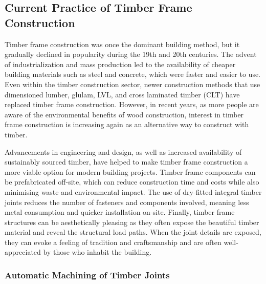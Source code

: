     
\subsection{Current Practice of Timber Frame Construction}
\label{subsection:introduction-current-practice-of-timber-frame-construction}

Timber frame construction was once the dominant building method, but it gradually declined in popularity during the 19th and 20th centuries. The advent of industrialization and mass production led to the availability of cheaper building materials such as steel and concrete, which were faster and easier to use. Even within the timber construction sector, newer construction methods that use dimensioned lumber, glulam, LVL, and cross laminated timber (CLT) have replaced timber frame construction. However, in recent years, as more people are aware of the environmental benefits of wood construction, interest in timber frame construction is increasing again as an alternative way to construct with timber. 

Advancements in engineering and design, as well as increased availability of sustainably sourced timber, have helped to make timber frame construction a more viable option for modern building projects. Timber frame components can be prefabricated off-site, which can reduce construction time and costs while also minimising waste and environmental impact. The use of dry-fitted integral timber joints reduces the number of fasteners and components involved, meaning less metal consumption and quicker installation on-site. Finally, timber frame structures can be aesthetically pleasing as they often expose the beautiful timber material and reveal the structural load paths. When the joint details are exposed, they can evoke a feeling of tradition and craftsmanship and are often well-appreciated by those who inhabit the building.

\subsubsection{Automatic Machining of Timber Joints}
\label{subsubsection:introduction-automatic-machining-of-timber-joints}

